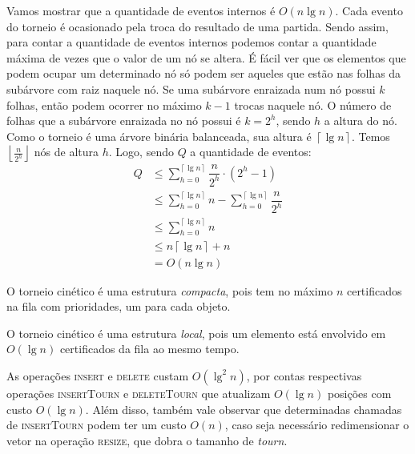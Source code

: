 Vamos mostrar que a quantidade de eventos internos é $O(n\lg{n})$. Cada evento
do torneio é ocasionado pela troca do resultado de uma partida. Sendo assim,
para contar a quantidade de eventos internos podemos contar a quantidade máxima
de vezes que o valor de um nó se altera. É fácil ver que os elementos que podem
ocupar um determinado nó só podem ser aqueles que estão nas folhas da subárvore
com raiz naquele nó. Se uma subárvore enraizada num nó possui $k$ folhas, então
podem ocorrer no máximo $k-1$ trocas naquele nó. O número de folhas que a
subárvore enraizada no nó possui é $k = 2^h$, sendo $h$ a altura do nó. Como o
torneio é uma árvore binária balanceada, sua altura é $\left\lceil \lg{n}
\right\rceil$. Temos $\left\lfloor \frac{n}{2^h}\right\rfloor$ nós de altura
$h$. Logo, sendo $Q$ a quantidade de eventos:
\begin{align*}
    Q & \leq \displaystyle\sum_{h = 0}^{\left\lceil \lg{n}\right\rceil} \dfrac{n}{2^h}\cdot (2^h - 1) \\\nonumber
    & \leq \displaystyle\sum_{h = 0}^{\left\lceil \lg{n}\right\rceil} n - \displaystyle\sum_{h = 0}^{\left\lceil \lg{n}\right\rceil} \dfrac{n}{2^h} \\ \nonumber
    & \leq \displaystyle\sum_{h = 0}^{\left\lceil \lg{n}\right\rceil} n \\ \nonumber
    & \leq n\left\lceil \lg{n}\right\rceil + n \\\nonumber
    & = O(n \lg{n})\nonumber
\end{align*}

O torneio cinético é uma estrutura \textit{compacta}, pois tem no máximo $n$
certificados na fila com prioridades, um para cada objeto.

O torneio cinético é uma estrutura \textit{local}, pois um elemento está envolvido
em $O(\lg{n})$ certificados da fila ao mesmo tempo.

As operações \textsc{insert} e \textsc{delete} custam $O(\lg^2{n})$, por contas
respectivas operações \textsc{insertTourn} e \textsc{deleteTourn} que atualizam
$O(\lg{n})$ posições com custo $O(\lg{n})$. Além disso, também vale observar que
determinadas chamadas de \textsc{insertTourn} podem ter um custo $O(n)$, caso
seja necessário redimensionar o vetor na operação \textsc{resize}, que dobra o
tamanho de \textit{tourn}.


